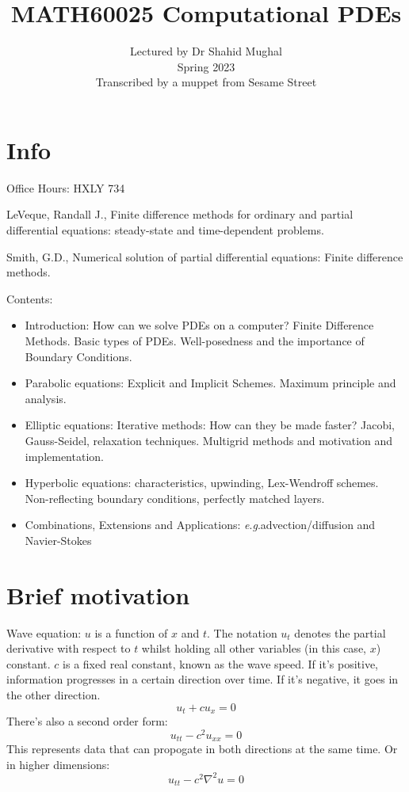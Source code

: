 \documentclass{article}
\title{MATH60025 Computational PDEs}
\author{Lectured by Dr Shahid Mughal\\
Spring 2023\\
Transcribed by a muppet from Sesame Street
}
\date{}
\numberwithin{equation}{section}
\theoremstyle{definition}
\newcommand{\eg}{\textit{e}.\textit{g}.}
\begin{document}
\maketitle


\section{Info}
Office Hours: HXLY 734

LeVeque, Randall J., Finite difference methods for ordinary and partial differential equations: steady-state and time-dependent problems.

Smith, G.D., Numerical solution of partial differential equations: Finite difference methods.

Contents:
\begin{itemize}
    \item Introduction: How can we solve PDEs on a computer? Finite Difference Methods. Basic types of PDEs. Well-posedness and the importance of Boundary Conditions.
    \item Parabolic equations: Explicit and Implicit Schemes. Maximum principle and analysis.
    \item Elliptic equations: Iterative methods: How can they be made faster? Jacobi, Gauss-Seidel, relaxation techniques. Multigrid methods and motivation and implementation.
    \item Hyperbolic equations: characteristics, upwinding, Lex-Wendroff schemes. Non-reflecting boundary conditions, perfectly matched layers.
    \item Combinations, Extensions and Applications: \eg advection/diffusion and Navier-Stokes
\end{itemize}

\section{Brief motivation}

Wave equation: $u$ is a function of $x$ and $t$. The notation $u_t$ denotes the partial derivative with respect to $t$ whilst holding all other variables (in this case, $x$) constant. $c$ is a fixed real constant, known as the wave speed. If it's positive, information progresses in a certain direction over time. If it's negative, it goes in the other direction. 
\begin{equation}
    u_t + cu_x = 0
\end{equation}
There's also a second order form:
\begin{equation}
    u_{tt} - c^2 u_{xx} = 0
\end{equation}
This represents data that can propogate in both directions at the same time.
Or in higher dimensions:
\begin{equation}
    u_{tt} - c^2 \nabla^2u = 0
\end{equation}
\end{document}
